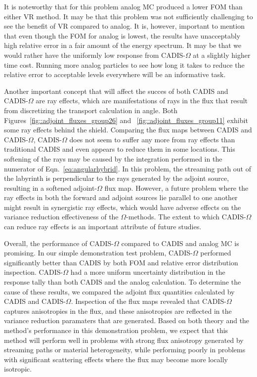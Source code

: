\documentclass[12pt]{article}
\begin{document}
It is noteworthy that for this problem analog MC produced a lower FOM than either VR method. 
It may be that this problem was not sufficiently challenging to see the benefit of VR compared to analog. 
It is, however, important to mention that even though the FOM for analog is lowest, the results have unacceptably high relative error in a fair amount of the energy spectrum. 
It may be that we would rather have the uniformly low response from CADIS-$\Omega$ at a slightly higher time cost.
Running more analog particles to see how long it takes to reduce the relative error to acceptable levels everywhere will be an informative task. 

Another important concept that will affect the succes of both CADIS and CADIS-$\Omega$ are ray effects, which are manifestations of rays in the flux that result from discretizing the transport calculation in angle. Both Figures~\ref{fig::adjoint_fluxes_group26} and ~\ref{fig::adjoint_fluxes_group11} exhibit some ray effects behind the shield. Comparing the flux maps between CADIS and  CADIS-$\Omega$, CADIS-$\Omega$ does not seem to suffer any more from ray effects than traditional CADIS and even appears to reduce them in some locations. This softening of the rays may be caused by the integration performed in the numerator of Eqn.~\eqref{eq:angularhybrid}. In this problem, the streaming path out of the labyrinth is perpendicular to the rays generated by the adjoint source, resulting in a softened adjoint-$\Omega$ flux map. However, a future problem where the ray effects in both the forward and adjoint sources lie parallel to one another might result in synergistic ray effects, which would have adverse effects on the variance reduction effectiveness of the $\Omega$-methods. The extent to which CADIS-$\Omega$ can reduce ray effects is an important attribute of future studies.

Overall, the performance of CADIS-$\Omega$ compared to CADIS and analog MC is promising. In our simple demonstration test problem, CADIS-$\Omega$ performed significantly better than CADIS by both FOM and relative error distribution inspection. CADIS-$\Omega$ had a more uniform uncertainty distribution in the response tally than both CADIS and the analog calculation. To determine the cause of these results, we compared the adjoint flux quantities calculated by CADIS and CADIS-$\Omega$. Inspection of the flux maps revealed that CADIS-$\Omega$ captures anisotropies in the flux, and these anisotropies are reflected in the variance reduction paramaters that are generated. Based on both theory and the method's performance in this demonstration problem, we expect that this method will perform well in problems with strong flux anisotropy generated by streaming paths or material heterogeneity, while performing poorly in problems with significant scattering effects where the flux may become more locally isotropic. 
 
\end{document}

